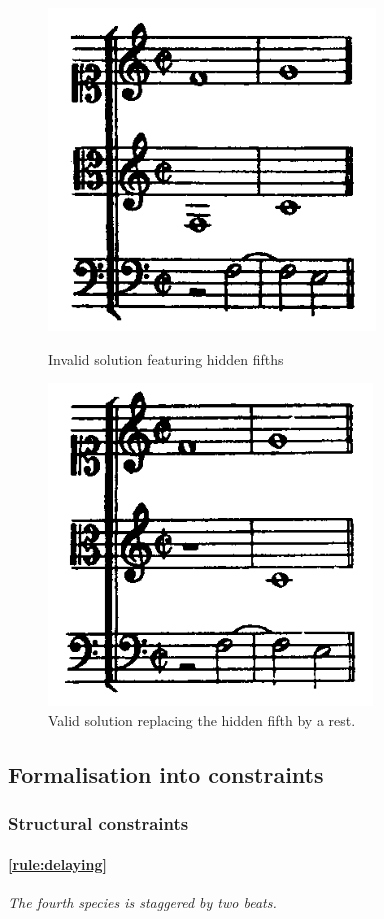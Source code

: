 \begin{enumerate}[wide, label=\bfseries 4.P\arabic*]
    \begin{figure}[h]
        \centering
        \begin{minipage}{0.49\textwidth}
            \centering
            \includegraphics[width=.4\textwidth]{Images/hidden-fifths-1.png}
            \caption{Invalid solution featuring hidden fifths}
            \label{fig:hidden-fifths-1}
        \end{minipage}
        \hfill
        \begin{minipage}{0.49\textwidth}
            \centering
            \includegraphics[width=.4\textwidth]{Images/hidden-fifths-2.png}
            \caption{Valid solution replacing the hidden fifth by a rest.}
            \label{fig:hidden-fifths-2}
        \end{minipage}
    \end{figure}

\end{enumerate}

\subsection{Formalisation into constraints}\label{formalisation-c-4th}
\subsubsection{Structural constraints}
    \paragraph{\hspace{.5cm}\ref{rule:delaying}} \textit{The fourth species is staggered by two beats.}

